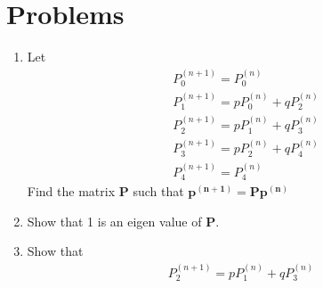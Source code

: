 \documentclass[journal,12pt,onecolumn]{IEEEtran}
\renewcommand\thesection{\arabic{section}}
\providecommand{\brak}[1]{\ensuremath{\left(#1\right)}}
\theoremstyle{remark}
\newcommand{\myvec}[1]{\ensuremath{\begin{pmatrix}#1\end{pmatrix}}}
\numberwithin{equation}{section}
\let\vec\mathbf
\begin{document}
\section{Problems}
\begin{enumerate}[label=\arabic*.,ref=\thesection.\theenumi]
\item Let
\begin{align}
&P_0^{(n+1)} = P_0^{(n)}\\
&P_1^{(n+1)} = pP_0^{(n)} + qP_2^{(n)} \\
&P_2^{(n+1)} = pP_1^{(n)} + qP_3^{(n)} \\
&P_3^{(n+1)} = pP_2^{(n)} + qP_4^{(n)} \\
&P_4^{(n+1)} = P_4^{(n)}
\end{align}
Find the matrix $\vec{P}$ such that $\vec{p^{(n+1)}} = \vec{P}\vec{p^{(n)}}	$
\item Show that 1 is an eigen value of $\vec{P}.$
\item Show that 
\begin{align}
	P_2^{(n+1)} = pP_1^{(n)} + qP_3^{(n)}
\end{align}


\end{enumerate}
\end{document}
